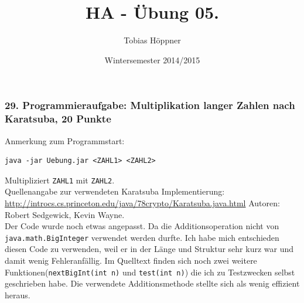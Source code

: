 \documentclass[ngerman,a4paper]{report}
\author{Tobias Höppner}
\title{HA - Übung 05.}
\date{Wintersemester 2014/2015}
\renewcommand{\maketitle}{}
\begin{document}
 
\maketitle 

\subsubsection*{29. Programmieraufgabe: Multiplikation langer Zahlen nach Karatsuba, 20 Punkte}
Anmerkung zum Programmstart:
\begin{lstlisting}
java -jar Uebung.jar <ZAHL1> <ZAHL2>
\end{lstlisting}
Multipliziert \lstinline!ZAHL1! mit \lstinline!ZAHL2!.\\

Quellenangabe zur verwendeten Karatsuba Implementierung: \url{http://introcs.cs.princeton.edu/java/78crypto/Karatsuba.java.html}
Autoren:  Robert Sedgewick, Kevin Wayne.\\

Der Code wurde noch etwas angepasst. Da die Additionsoperation nicht von \lstinline!java.math.BigInteger! verwendet werden durfte. Ich habe mich entschieden diesen Code zu verwenden, weil er in der Länge und Struktur sehr kurz war und damit wenig Fehleranfällig. Im Quelltext finden sich noch zwei weitere Funktionen(\lstinline!nextBigInt(int n)! und \lstinline!test(int n)!) die ich zu Testzwecken selbst geschrieben habe. Die verwendete Additionsmethode stellte sich als wenig effizient heraus. 
\end{document}
